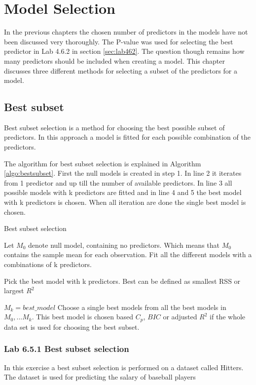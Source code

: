 \chapter{Model Selection}
\label{chp:subsel}

In the previous chapters the chosen number of predictors in the models have not been discussed very thoroughly. The P-value was used for selecting the best predictor in Lab 4.6.2 in section \ref{sec:lab462}. The question though remains how many predictors should be included when creating a model. This chapter discusses three different methods for selecting a subset of the predictors for a model.

\section{Best subset}
Best subset selection is a method for choosing the best possible subset of predictors. In this approach a model is fitted for each possible combination of the predictors.

The algorithm for best subset selection is explained in Algorithm \ref{algo:bestsubset}. First the null models is created in step 1. In line 2 it iterates from 1 predictor and up till the number of available predictors. In line 3 all possible models with k predictors are fitted and in line 4 and 5 the best model with k predictors is chosen. When all iteration are done the single best model is chosen.

\begin{algorithm}
	\caption{Best subset selection}
	\label{algo:bestsubset}
	\begin{algorithmic}[1]
		\State Let $M_0$ denote null model, containing no predictors. Which means that $M_0$ contains the sample mean for each observation.
		\State Fit all the different models with a combinations of k predictors.
		\State \parbox[t]{\dimexpr\linewidth-\algorithmicindent}{Pick the best model with k predictors. Best can be defined as smallest RSS or largest $R^2$}
		\State $M_k = best\_model$
		\EndFor
		\State Choose a single best models from all the best models in $M_0,...M_k$. This best model is chosen based $C_p$, $BIC$ or adjusted $R^2$ if the whole data set is used for choosing the best subset.
	\end{algorithmic}
\end{algorithm}


\subsection{Lab 6.5.1 Best subset selection}
In this exercise a best subset selection is performed on a dataset called Hitters. The dataset is used for predicting the salary of baseball players

